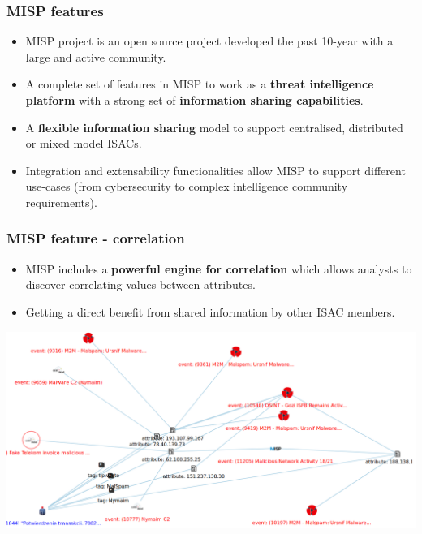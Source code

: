 \begin{frame}
    \frametitle{MISP features}
    \begin{itemize}
            \item MISP project is an open source project developed the past 10-year with a large and active community.
            \item A complete set of features in MISP to work as a {\bf threat intelligence platform} with a strong set of {\bf information sharing capabilities}. 
            \item A {\bf flexible information sharing} model to support centralised, distributed or mixed model ISACs.
            \item Integration and extensability functionalities allow MISP to support different use-cases (from cybersecurity to complex intelligence community requirements).
    \end{itemize}
\end{frame}

\begin{frame}
    \frametitle{MISP feature - correlation}
    \begin{itemize}
        \item MISP includes a {\bf powerful engine for correlation} which allows analysts to discover correlating values between attributes. 
        \item Getting a direct benefit from shared information by other ISAC members.
    \end{itemize}
    \includegraphics[scale=0.20]{campaign.png}
\end{frame}


